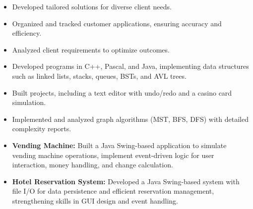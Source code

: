 \documentclass[10pt,a4paper,withhyper]{altacv}
\begin{document}
\begin{paracol}{2}






\begin{itemize}
\item Developed tailored solutions for diverse client needs.
\item Organized and tracked customer applications, ensuring accuracy and efficiency.
\item Analyzed client requirements to optimize outcomes.
\end{itemize}


\begin{itemize}
\item Developed programs in C++, Pascal, and Java, implementing data structures such as linked lists, stacks,
queues, BSTs, and AVL trees.
\item Built projects, including a text editor with undo/redo and a casino card simulation.
\item Implemented and analyzed graph algorithms (MST, BFS, DFS) with detailed complexity reports.
\end{itemize}

\divider

\begin{itemize}
  \item \textbf{Vending Machine:} Built a Java Swing-based application to simulate vending machine operations,
implement event-driven logic for user interaction, money handling, and change calculation.
  \item \textbf{Hotel Reservation System:} Developed a Java Swing-based system with file I/O for data persistence and
efficient reservation management, strengthening skills in GUI design and event handling.
\end{itemize}
\medskip


\end{paracol}
\end{document}
